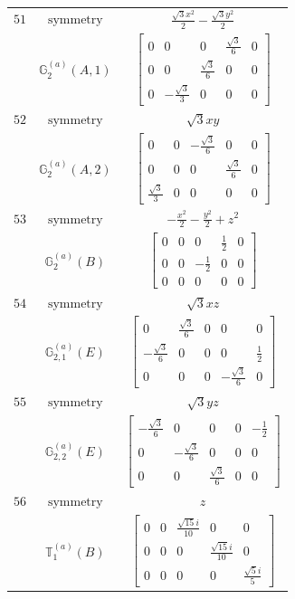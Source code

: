 \documentclass[fleqn,8pt,landscape]{jsarticle}
\begin{document}
\begin{longtable}{ccc}
$ 51 $ & $ \text{symmetry} $ & $ \frac{\sqrt{3} x^{2}}{2} - \frac{\sqrt{3} y^{2}}{2} $ \\
$  $ & $ \mathbb{G}_{2}^{(a)}(A,1) $ & $ \begin{bmatrix} 0 & 0 & 0 & \frac{\sqrt{3}}{6} & 0 \\ 0 & 0 & \frac{\sqrt{3}}{6} & 0 & 0 \\ 0 & - \frac{\sqrt{3}}{3} & 0 & 0 & 0 \end{bmatrix} $ \\ \hline
$ 52 $ & $ \text{symmetry} $ & $ \sqrt{3} x y $ \\
$  $ & $ \mathbb{G}_{2}^{(a)}(A,2) $ & $ \begin{bmatrix} 0 & 0 & - \frac{\sqrt{3}}{6} & 0 & 0 \\ 0 & 0 & 0 & \frac{\sqrt{3}}{6} & 0 \\ \frac{\sqrt{3}}{3} & 0 & 0 & 0 & 0 \end{bmatrix} $ \\ \hline
$ 53 $ & $ \text{symmetry} $ & $ - \frac{x^{2}}{2} - \frac{y^{2}}{2} + z^{2} $ \\
$  $ & $ \mathbb{G}_{2}^{(a)}(B) $ & $ \begin{bmatrix} 0 & 0 & 0 & \frac{1}{2} & 0 \\ 0 & 0 & - \frac{1}{2} & 0 & 0 \\ 0 & 0 & 0 & 0 & 0 \end{bmatrix} $ \\ \hline
$ 54 $ & $ \text{symmetry} $ & $ \sqrt{3} x z $ \\
$  $ & $ \mathbb{G}_{2,1}^{(a)}(E) $ & $ \begin{bmatrix} 0 & \frac{\sqrt{3}}{6} & 0 & 0 & 0 \\ - \frac{\sqrt{3}}{6} & 0 & 0 & 0 & \frac{1}{2} \\ 0 & 0 & 0 & - \frac{\sqrt{3}}{6} & 0 \end{bmatrix} $ \\ \hline
$ 55 $ & $ \text{symmetry} $ & $ \sqrt{3} y z $ \\
$  $ & $ \mathbb{G}_{2,2}^{(a)}(E) $ & $ \begin{bmatrix} - \frac{\sqrt{3}}{6} & 0 & 0 & 0 & - \frac{1}{2} \\ 0 & - \frac{\sqrt{3}}{6} & 0 & 0 & 0 \\ 0 & 0 & \frac{\sqrt{3}}{6} & 0 & 0 \end{bmatrix} $ \\ \hline
$ 56 $ & $ \text{symmetry} $ & $ z $ \\
$  $ & $ \mathbb{T}_{1}^{(a)}(B) $ & $ \begin{bmatrix} 0 & 0 & \frac{\sqrt{15} i}{10} & 0 & 0 \\ 0 & 0 & 0 & \frac{\sqrt{15} i}{10} & 0 \\ 0 & 0 & 0 & 0 & \frac{\sqrt{5} i}{5} \end{bmatrix} $ \\ \hline

\end{longtable}
\end{document}
